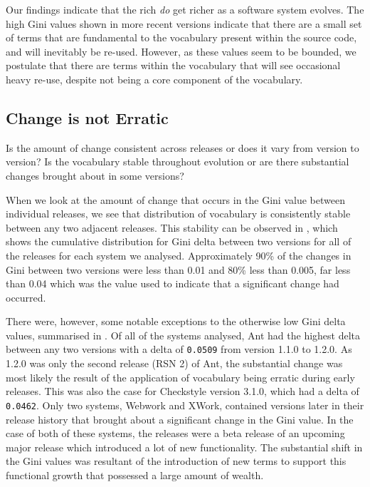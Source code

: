 Our findings indicate that the rich \emph{do} get richer as a software system evolves. The high Gini values shown in more recent versions indicate that there are a small set of terms that are fundamental to the vocabulary present within the source code, and will inevitably be re-used. However, as these values seem to be bounded, we postulate that there are terms within the vocabulary that will see occasional heavy re-use, despite not being a core component of the vocabulary.


\subsection{Change is not Erratic} %
\label{ssub:change_is_not_erratic}

Is the amount of change consistent across releases or does it vary from version to version? Is the vocabulary stable throughout evolution or are there substantial changes brought about in some versions?

When we look at the amount of change that occurs in the Gini value between individual releases, we see that distribution of vocabulary is consistently stable between any two adjacent releases. This stability can be observed in , which shows the cumulative distribution for Gini delta between two versions for all of the releases for each system we analysed. Approximately 90\% of the changes in Gini between two versions were less than 0.01 and 80\% less than 0.005, far less than 0.04 which was the value used to indicate that a significant change had occurred.

There were, however, some notable exceptions to the otherwise low Gini delta values, summarised in . Of all of the systems analysed, Ant had the highest delta between any two versions with a delta of \texttt{0.0509} from version 1.1.0 to 1.2.0. As 1.2.0 was only the second release (RSN 2) of Ant, the substantial change was most likely the result of the application of vocabulary being erratic during early releases. This was also the case for Checkstyle version 3.1.0, which had a delta of \texttt{0.0462}. Only two systems, Webwork and XWork, contained versions later in their release history that brought about a significant change in the Gini value. In the case of both of these systems, the releases were a beta release of an upcoming major release which introduced a lot of new functionality. The substantial shift in the Gini values was resultant of the introduction of new terms to support this functional growth that possessed a large amount of wealth.

